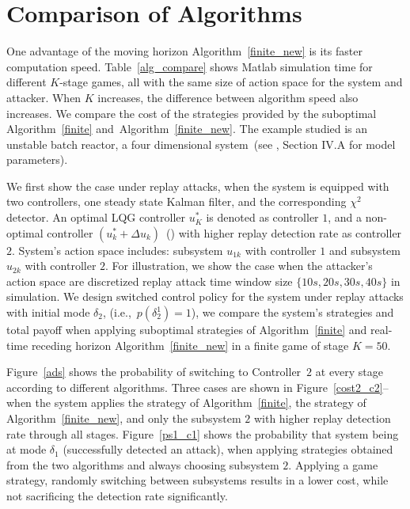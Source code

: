 \section{Comparison of Algorithms}
\label{sec:simulation}
One advantage of the moving horizon Algorithm~\ref{finite_new} is its faster computation speed. Table~\ref{alg_compare} shows Matlab simulation time for different $K$-stage games, all with the same size of action space for the system and attacker. When $K$ increases, the difference between algorithm speed also increases.
We compare the cost of the strategies provided by the suboptimal Algorithm~\ref{finite} and~Algorithm~\ref{finite_new}.
The example studied is an unstable batch reactor, a four dimensional system~(see \cite{ncs}, Section IV.A for model parameters).

We first show the case under replay attacks, when the system is equipped with two controllers, one steady state Kalman filter, and the corresponding $\chi^2$ detector. An optimal LQG controller $u^*_K$ is denoted as controller $1$, and a non-optimal controller $(u^{*}_{k} + \Delta u_{k})$~(\cite{replay}) with higher replay detection rate as controller $2$. System's action space includes: subsystem $u_{1k}$ with controller $1$ and subsystem  $u_{2k}$ with controller $2$. For illustration, we show the case when the attacker's action space are discretized replay attack time window size $\{10s, 20s, 30s, 40s\}$ in simulation. We design switched control policy for the system under replay attacks with initial mode $\delta_{2}$, (i.e.,~$p(\delta^{1}_{2})=1$), we compare the system's strategies and total payoff when applying suboptimal strategies of Algorithm~\ref{finite} and real-time receding horizon Algorithm~\ref{finite_new} in a finite game of stage $K=50$.



Figure~\ref{ads} shows the probability of switching to Controller~$2$ at every stage according to different algorithms.
Three cases are shown in Figure~\ref{cost2_c2}--when the system applies the strategy of Algorithm~\ref{finite}, the strategy of Algorithm~\ref{finite_new}, and only the subsystem $2$ with higher replay detection rate through all stages. 
Figure~\ref{ps1_c1} shows the probability that system being at mode $\delta_{1}$ (successfully detected an attack), when applying strategies obtained from the two algorithms and always choosing subsystem $2$. Applying a game strategy, randomly switching between subsystems results in a lower cost, while not sacrificing the detection rate significantly. 


